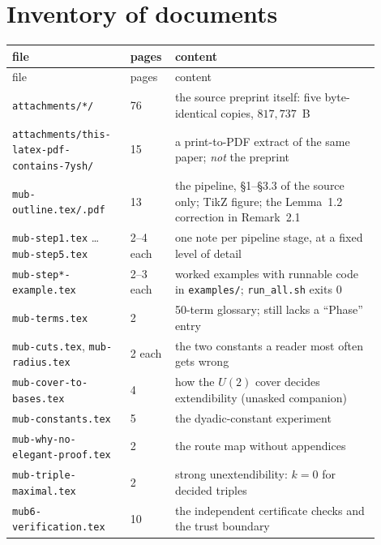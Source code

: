 \documentclass[10pt]{article}
\theoremstyle{definition}
\newcommand{\file}[1]{\texttt{\small #1}}
\begin{document}
\section{Inventory of documents}\label{sec:inv}

\begin{center}
\small
\begin{longtable}{@{}L{0.30\linewidth}L{0.08\linewidth}L{0.52\linewidth}@{}}
\toprule
file & pages & content \\
\midrule
\endfirsthead
\toprule
file & pages & content \\
\midrule
\endhead
\file{attachments/*/} & 76 & the source preprint itself: five byte-identical copies, $817{,}737$~B \\
\file{attachments/this-latex-pdf-\allowbreak{}contains-\allowbreak{}7ysh/} & 15 & a print-to-PDF extract of the same paper; \emph{not} the preprint \\
\file{mub-\allowbreak{}outline.tex/\allowbreak{}.pdf} & 13 & the pipeline, \S1--\S3.3 of the source only; TikZ figure; the
Lemma~1.2 correction in Remark~2.1 \\
\file{mub-\allowbreak{}step1.tex} \dots \file{mub-\allowbreak{}step5.tex} & 2--4 each & one note per pipeline stage, at a fixed level
of detail \\
\file{mub-\allowbreak{}step*-\allowbreak{}example.tex} & 2--3 each & worked examples with runnable code in \file{examples/\allowbreak{}};
\file{run\_all.sh} exits $0$ \\
\file{mub-\allowbreak{}terms.tex} & 2 & 50-term glossary; still lacks a ``Phase'' entry \\
\file{mub-\allowbreak{}cuts.tex}, \file{mub-\allowbreak{}radius.tex} & 2 each & the two constants a reader most often gets wrong \\
\file{mub-\allowbreak{}cover-\allowbreak{}to-\allowbreak{}bases.tex} & 4 & how the $U(2)$ cover decides extendibility (unasked companion) \\
\file{mub-\allowbreak{}constants.tex} & 5 & the dyadic-constant experiment \\
\file{mub-\allowbreak{}why-\allowbreak{}no-\allowbreak{}elegant-\allowbreak{}proof.tex} & 2 & the route map without appendices \\
\file{mub-\allowbreak{}triple-\allowbreak{}maximal.tex} & 2 & strong unextendibility: $k=0$ for decided triples \\
\file{mub6-\allowbreak{}verification.tex} & 10 & the independent certificate checks and the trust boundary \\

\end{longtable}
\end{center}
\end{document}
